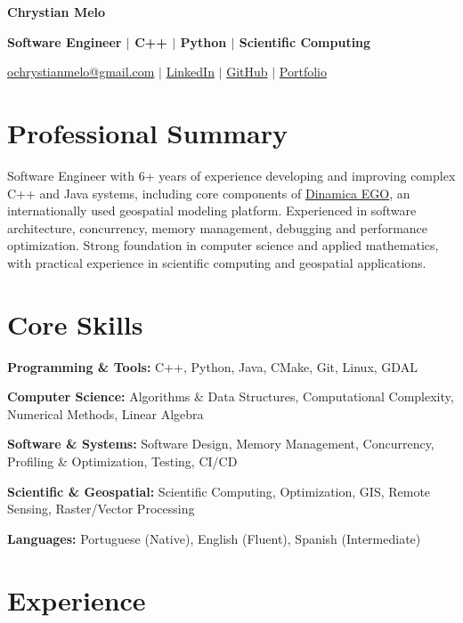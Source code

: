 \documentclass[10pt,a4paper]{article}
\begin{document}
{\centering
    {\Large\textbf{Chrystian Melo}}\par\vspace{0.1em}
    \textbf{Software Engineer $\vert$ C++ $\vert$ Python $\vert$ Scientific Computing}\par\vspace{0.1em}
    \href{mailto:ochrystianmelo@gmail.com}{ochrystianmelo@gmail.com} $\vert$
    \href{https://www.linkedin.com/in/chrystianmelo/}{LinkedIn} $\vert$
    \href{https://github.com/ChrystianMelo}{GitHub} $\vert$
    \href{https://chrystianmelo.github.io/}{Portfolio}\par
}
\vspace{0.25em}

\section*{Professional Summary}

Software Engineer with 6+ years of experience developing and improving complex C++ and Java systems, including core components of \href{https://www.dinamicaego.com/}{Dinamica EGO}, an internationally used geospatial modeling platform. Experienced in software architecture, concurrency, memory management, debugging and performance optimization. Strong foundation in computer science and applied mathematics, with practical experience in scientific computing and geospatial applications.

\section{Core Skills}

\noindent
\textbf{Programming \& Tools:} C++, Python, Java, CMake, Git, Linux, GDAL

\noindent
\textbf{Computer Science:} Algorithms \& Data Structures, Computational Complexity, Numerical Methods, Linear Algebra

\noindent
\textbf{Software \& Systems:} Software Design, Memory Management, Concurrency, Profiling \& Optimization, Testing, CI/CD

\noindent
\textbf{Scientific \& Geospatial:} Scientific Computing, Optimization, GIS, Remote Sensing, Raster/Vector Processing

\noindent
\textbf{Languages:} Portuguese (Native), English (Fluent), Spanish (Intermediate)

\section*{Experience}
\end{document}
